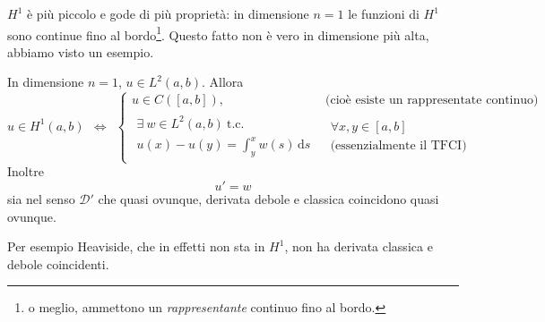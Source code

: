 \documentclass[10pt,a4paper,twoside,openright]{book}
\newcommand{\de}{\,\mathrm d}
\newcommand{\ds}{\de s}
\begin{document}
$H^{1}$ è più piccolo e gode di più proprietà: in dimensione $n=1$ le funzioni di $H^{1}$ sono continue fino al bordo\footnote{o meglio, ammettono un \textit{rappresentante} continuo fino al bordo.}. Questo fatto non è vero in dimensione più alta, abbiamo visto un esempio.
\begin{theorem}
	[Microteorema] In dimensione $n=1$, $u\in L^{2}(a,b)$. Allora
	\begin{equation*}
		u\in H^{1}(a,b) \ \ \Leftrightarrow \ \ \begin{cases}
		u\in C([ a,b]) , & \text{(cioè esiste un rappresentate continuo)}\\
		\begin{array}{l}
			\exists \ w\in L^{2}(a,b) \ \text{t.c.} \\
			u(x) -u(y) =\int ^{x}_{y} w(s) \ds     
		\end{array} &  \begin{array}{l}
		\forall x,y\in [ a,b]\\
		\text{(essenzialmente il TFCI)}
		\end{array}
		\end{cases}
	\end{equation*}
	Inoltre
	\begin{equation*}
		u'=w
	\end{equation*}
	sia nel senso $\mathcal{D} '$ che quasi ovunque, derivata debole e classica coincidono quasi ovunque.
\end{theorem}
Per esempio Heaviside, che in effetti non sta in $H^{1}$, non ha derivata classica e debole coincidenti.
\end{document}
